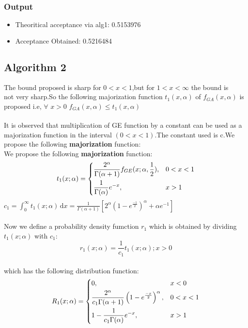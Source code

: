 \documentclass[11pt]{article}
\begin{document}
\subsubsection{Output}
\begin{itemize}
\item Theoritical acceptance via alg1: 0.5153976 
\item Acceptance Obtained: 0.5216484 
\end{itemize}
\subsection{Algorithm 2}
The bound proposed is sharp for $0<x<1$,but for $1<x<\infty$ the bound is\\
not very sharp.So the following majorization function $t_{1}(x,\alpha)$ of      $f_{GA}(x,\alpha)$  is proposed i.e, $\forall$ $x>0$ $f_{GA}(x,\alpha)\leq t_{1}(x,\alpha)$\\ \\
It is observed that multiplication of  GE function by  a constant can be used as a majorization function in the interval $(0<x<1)$.The constant used is c.We propose the following \textbf{majorization} function:\\
We propose the following \textbf{majorization} function:
\[
t_1(x;\alpha) = 
\begin{dcases}
\frac{2^{\alpha}}{\Gamma(\alpha+1)}f_{GE}(x;\alpha,\frac{1}{2}), & 0<x<1\\
\frac{1}{\Gamma(\alpha)}e^{-x}, & x>1 
\end{dcases}
\]
$c_1=\int_0^\infty
t_1(x;\alpha)\,\mathrm{d}x=\frac{1}{\Gamma(\alpha+1)}\left[2^{\alpha}\left(1-e^{\frac{-1}{2}}\right)^{\alpha}+\alpha e^{-1}\right]$\\ \\
Now we define a probability density fumction $r_1$ which is obtained by dividing $t_1(x;\alpha)$ with $c_1$:
$$r_1(x;\alpha) = \frac{1}{c_1}t_1(x;\alpha);     x>0$$\\
which has the following distribution function:
\[
R_1(x;\alpha)=
\begin{dcases}
0, & x<0\\
\frac{2^\alpha}{c_1 \Gamma(\alpha+1)}\left(1-e^{\frac{-x}{2}}\right)^{\alpha}, & 0<x<1\\
1-\frac{1}{c_1 \Gamma(\alpha)}e^{-x}, & x>1\\
\end{dcases}
\]
\end{document}
